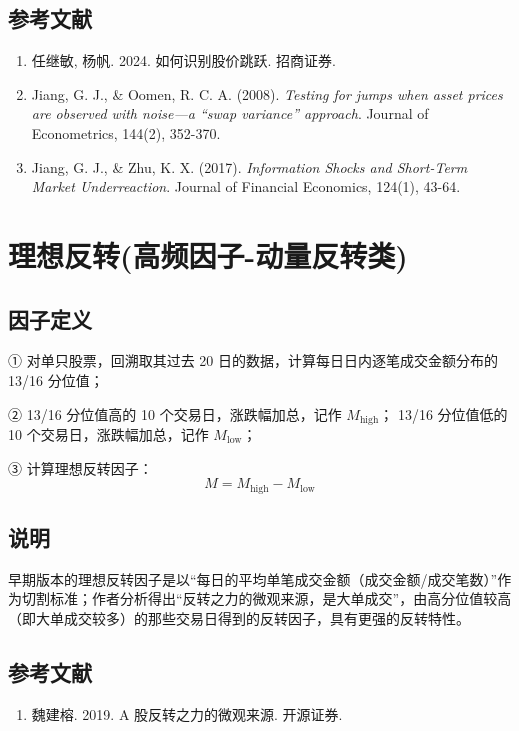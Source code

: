 \documentclass{article}
\begin{document}
\subsection{参考文献}
\begin{enumerate}
    \item 任继敏, 杨帆. 2024. 如何识别股价跳跃. 招商证券.
    \item Jiang, G. J., \& Oomen, R. C. A. (2008). \textit{Testing for jumps when asset prices are observed with noise—a “swap variance” approach}. Journal of Econometrics, 144(2), 352-370.
    \item Jiang, G. J., \& Zhu, K. X. (2017). \textit{Information Shocks and Short-Term Market Underreaction}. Journal of Financial Economics, 124(1), 43-64.
\end{enumerate}

\section{理想反转(高频因子-动量反转类)}

\subsection{因子定义}


① 对单只股票，回溯取其过去 20 日的数据，计算每日日内逐笔成交金额分布的 13/16 分位值；

② 13/16 分位值高的 10 个交易日，涨跌幅加总，记作 \( M_{\text{high}} \)；
13/16 分位值低的 10 个交易日，涨跌幅加总，记作 \( M_{\text{low}} \)；

③ 计算理想反转因子：
\begin{equation}
    M = M_{\text{high}} - M_{\text{low}}
\end{equation}

\subsection{说明}
早期版本的理想反转因子是以“每日的平均单笔成交金额（成交金额/成交笔数）”作为切割标准；作者分析得出“反转之力的微观来源，是大单成交”，由高分位值较高（即大单成交较多）的那些交易日得到的反转因子，具有更强的反转特性。

\subsection{参考文献}
\begin{enumerate}
    \item 魏建榕. 2019. A 股反转之力的微观来源. 开源证券.
\end{enumerate}
\end{document}
